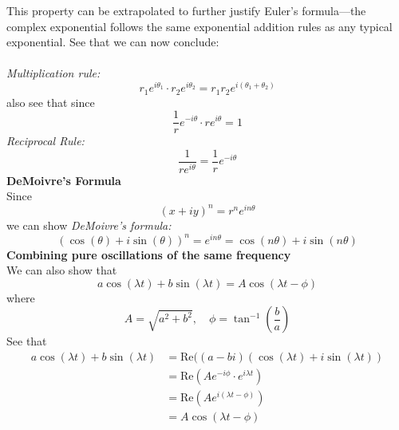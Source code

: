 \documentclass{report}
\begin{document}
This property can be extrapolated to further justify Euler's formula---the complex exponential follows
the same exponential addition rules as any typical exponential. See that we can now conclude:\\
\vspace{1mm}\\
\textit{Multiplication rule:}
\begin{equation*}
r_1e^{i\theta_1}\cdot r_2e^{i\theta_2}=r_1r_2e^{i(\theta_1+\theta_2)}
\end{equation*}
also see that since
\begin{equation*}
\frac{1}{r}e^{-i\theta}\cdot re^{i\theta}=1
\end{equation*}
\textit{Reciprocal Rule:} 
\begin{equation*}
\frac{1}{re^{i\theta}}=\frac{1}{r}e^{-i\theta}
\end{equation*}
\textbf{DeMoivre's Formula}\\
Since 
\begin{equation*}
(x+iy)^n=r^ne^{in\theta}
\end{equation*}
we can show \textit{DeMoivre's formula:}
\begin{equation*}
(\cos(\theta)+i\sin(\theta))^n=e^{in\theta}=\cos(n\theta)+i\sin(n\theta)
\end{equation*}
\textbf{Combining pure oscillations of the same frequency}\\
We can also show that
\begin{equation*}
a\cos(\lambda t)+b\sin(\lambda t)=A\cos(\lambda t-\phi)
\end{equation*}
where
\begin{equation*}
A=\sqrt{a^2+b^2},\quad\phi=\tan^{-1}\left(\frac{b}{a}\right)
\end{equation*}
See that
\begin{align*}
a\cos(\lambda t)+b\sin(\lambda t)&=\text{Re}((a-bi)(\cos(\lambda t)+i\sin(\lambda t))\\
&=\text{Re}(Ae^{-i\phi}\cdot e^{i\lambda t})\\
&=\text{Re}(Ae^{i(\lambda t-\phi)})\\
&=A\cos(\lambda t-\phi)
\end{align*}
\newpage
\end{document}
